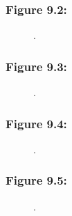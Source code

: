 \documentclass[t]{beamer}\usepackage[]{graphicx}\usepackage[]{color}
\begin{document}
\begin{frame}[label=Figure_9_2]
\frametitle{Figure 9.2: }
\begin{figure}[t]
\begin{minipage}[b]{\textwidth}
\centering

\caption{.}
\end{minipage}
\end{figure}
\end{frame}


\begin{frame}[label=Figure_9_3]
\frametitle{Figure 9.3: }
\begin{figure}[t]
\begin{minipage}[b]{\textwidth}
\centering

\caption{.}
\end{minipage}
\end{figure}
\end{frame}


\begin{frame}[label=Figure_9_4]
\frametitle{Figure 9.4: }
\begin{figure}[t]
\begin{minipage}[b]{\textwidth}
\centering

\caption{.}
\end{minipage}
\end{figure}
\end{frame}


\begin{frame}[label=Figure_9_5]
\frametitle{Figure 9.5: }
\begin{figure}[t]
\begin{minipage}[b]{\textwidth}
\centering

\caption{.}
\end{minipage}
\end{figure}
\end{frame}
\end{document}
